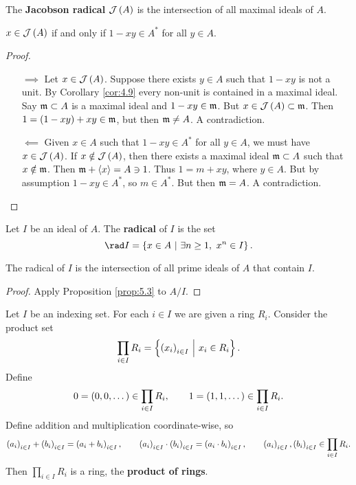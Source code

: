 \pagebreak

The \textbf{Jacobson radical} $ \JJJ\br{A} $ is the intersection of all maximal ideals of $ A $.

\begin{proposition}
$ x \in \JJJ\br{A} $ if and only if $ 1 - xy \in A^* $ for all $ y \in A $.
\end{proposition}

\begin{proof}
\hfill
\begin{itemize}
\item[$ \implies $] Let $ x \in \JJJ\br{A} $. Suppose there exists $ y \in A $ such that $ 1 - xy $ is not a unit. By Corollary \ref{cor:4.9} every non-unit is contained in a maximal ideal. Say $ \mathfrak{m} \subset A $ is a maximal ideal and $ 1 - xy \in \mathfrak{m} $. But $ x \in \JJJ\br{A} \subset \mmm $. Then $ 1 = \br{1 - xy} + xy \in \mmm $, but then $ \mathfrak{m} \ne A $. A contradiction.
\item[$ \impliedby $] Given $ x \in A $ such that $ 1 - xy \in A^* $ for all $ y \in A $, we must have $ x \in \JJJ\br{A} $. If $ x \notin \JJJ\br{A} $, then there exists a maximal ideal $ \mathfrak{m} \subset A $ such that $ x \notin \mathfrak{m} $. Then $ \mathfrak{m} + \left\langle x \right\rangle = A \ni 1 $. Thus $ 1 = m + xy $, where $ y \in A $. But by assumption $ 1 - xy \in A^* $, so $ m \in A^* $. But then $ \mathfrak{m} = A $. A contradiction.
\end{itemize}
\end{proof}

Let $ I $ be an ideal of $ A $. The \textbf{radical} of $ I $ is the set
$$ \rad I = \cbr{x \in A \st \exists n \ge 1, \ x^n \in I}. $$

\begin{proposition}
The radical of $ I $ is the intersection of all prime ideals of $ A $ that contain $ I $.
\end{proposition}

\begin{proof}
Apply Proposition \ref{prop:5.3} to $ A / I $.
\end{proof}


\begin{definition}
Let $ I $ be an indexing set. For each $ i \in I $ we are given a ring $ R_i $. Consider the product set
$$ \prod_{i \in I} R_i = \cbr{\br{x_i}_{i \in I} \st x_i \in R_i}. $$
Define
$$ 0 = \br{0, 0, \dots} \in \prod_{i \in I} R_i, \qquad 1 = \br{1, 1, \dots} \in \prod_{i \in I} R_i. $$
Define addition and multiplication coordinate-wise, so
$$ \br{a_i}_{i \in I} + \br{b_i}_{i \in I} = \br{a_i + b_i}_{i \in I}, \qquad \br{a_i}_{i \in I} \cdot \br{b_i}_{i \in I} = \br{a_i \cdot b_i}_{i \in I}, \qquad \br{a_i}_{i \in I}, \br{b_i}_{i \in I} \in \prod_{i \in I} R_i. $$
Then $ \prod_{i \in I} R_i $ is a ring, the \textbf{product of rings}.
\end{definition}

